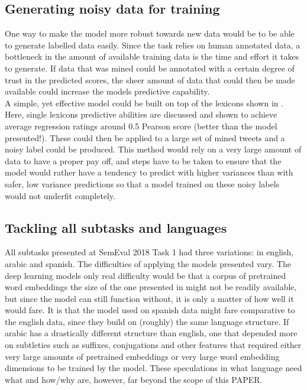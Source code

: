 \subsection{Generating noisy data for training}
One way to make the model more robust towards new data would be to be able to generate labelled data easily. Since the task relies on human annotated data, a bottleneck in the amount of available training data is the time and effort it takes to generate. If data that was mined could be annotated with a certain degree of trust in the predicted scores, the sheer amount of data that could then be made available could increase the models predictive capability.\\
A simple, yet effective model could be built on top of the lexicons shown in \cite{wassa2017}. Here, single lexicons predictive abilities are discussed and shown to achieve average regression ratings around 0.5 Pearson score (better than the model presented!). These could then be applied to a large set of mined tweets and a noisy label could be produced. This method would rely on a very large amount of data to have a proper pay off, and steps have to be taken to ensure that the model would rather have a tendency to predict with higher variances than with safer, low variance predictions so that a model trained on these noisy labels would not underfit completely.

\subsection{Tackling all subtasks and languages}
All subtasks presented at SemEval 2018 Task 1 had three variations: in english, arabic and spanish. The difficulties of applying the models presented vary. The deep learning models only real difficulty would be that a corpus of pretrained word embeddings the size of the one presented in \cite{godin} might not be readily available, but since the model can still function without, it is only a matter of how well it would fare. It is that the model used on spanish data might fare comparative to the english data, since they build on (roughly) the same language structure. If arabic has a drastically different structure than english, one that depended more on subtleties such as suffixes, conjugations and other features that required either very large amounts of pretrained embeddings or very large word embedding dimensions to be trained by the model. These speculations in what language need what and how/why are, however, far beyond the scope of this PAPER.
